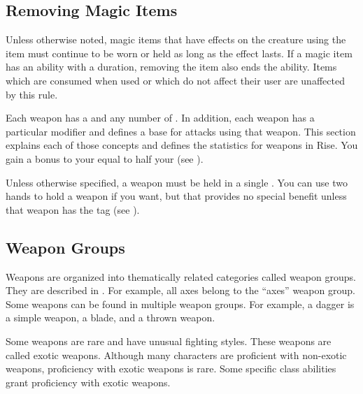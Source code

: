   \subsection{Removing Magic Items}
    Unless otherwise noted, magic items that have effects on the creature using the item must continue to be worn or held as long as the effect lasts.
    If a magic item has an ability with a duration, removing the item also ends the ability.
    Items which are consumed when used or which do not affect their user are unaffected by this rule.

\newpage
{}

  Each weapon has a  and any number of .
  In addition, each weapon has a particular  modifier and defines a base  for attacks using that weapon.
  This section explains each of those concepts and defines the statistics for weapons in Rise.
  You gain a bonus to your  equal to half your  (see ).

  Unless otherwise specified, a weapon must be held in a single .
  You can use two hands to hold a weapon if you want, but that provides no special benefit unless that weapon has the  tag (see ).

  \subsection{Weapon Groups}\label{Weapon Groups}
    Weapons are organized into thematically related categories called weapon groups. They are described in . For example, all axes belong to the ``axes'' weapon group. Some weapons can be found in multiple weapon groups. For example, a dagger is a simple weapon, a blade, and a thrown weapon.

     Some weapons are rare and have unusual fighting styles.
    These weapons are called exotic weapons.
    Although many characters are proficient with non-exotic weapons, proficiency with exotic weapons is rare.
    Some specific class abilities grant proficiency with exotic weapons.

